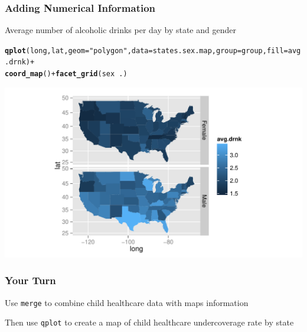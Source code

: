 \documentclass{beamer}\usepackage[]{graphicx}\usepackage[]{color}
\makeatletter
\newcommand{\hlstr}[1]{\textcolor[rgb]{0.192,0.494,0.8}{#1}}%
\newcommand{\hlopt}[1]{\textcolor[rgb]{0,0,0}{#1}}%
\newcommand{\hlstd}[1]{\textcolor[rgb]{0.345,0.345,0.345}{#1}}%
\newcommand{\hlkwc}[1]{\textcolor[rgb]{0.333,0.667,0.333}{#1}}%
\newcommand{\hlkwd}[1]{\textcolor[rgb]{0.737,0.353,0.396}{\textbf{#1}}}%
\newenvironment{kframe}{%
 \def\at@end@of@kframe{}%
 \ifinner\ifhmode%
  \def\at@end@of@kframe{\end{minipage}}%
  \begin{minipage}{\columnwidth}%
 \fi\fi%
 \def\FrameCommand##1{\hskip\@totalleftmargin \hskip-\fboxsep
 \colorbox{shadecolor}{##1}\hskip-\fboxsep
     \hskip-\linewidth \hskip-\@totalleftmargin \hskip\columnwidth}%
 \MakeFramed {\advance\hsize-\width
   \@totalleftmargin\z@ \linewidth\hsize
   \@setminipage}}%
 {\par\unskip\endMakeFramed%
 \at@end@of@kframe}
\newenvironment{knitrout}{}{} %
\makeatother
\begin{document}
\begin{frame}[fragile]
    \frametitle{Adding Numerical Information}

Average number of alcoholic drinks per day by state and gender

\begin{knitrout}\footnotesize
{}\color{fgcolor}\begin{kframe}
\begin{alltt}
\hlkwd{qplot}\hlstd{(long, lat,} \hlkwc{geom} \hlstd{=} \hlstr{"polygon"}\hlstd{,} \hlkwc{data} \hlstd{= states.sex.map,} \hlkwc{group} \hlstd{= group,} \hlkwc{fill} \hlstd{= avg.drnk)} \hlopt{+}
    \hlkwd{coord_map}\hlstd{()} \hlopt{+} \hlkwd{facet_grid}\hlstd{(sex} \hlopt{~} \hlstd{.)}
\end{alltt}
\end{kframe}
\includegraphics[width=\textwidth]{figure/kalcohol1} 

\end{knitrout}

\end{frame}


\begin{frame}
    \frametitle{Your Turn}
    Use \texttt{merge} to combine child healthcare data with maps information \\
    
    \vspace{.4in}
    
    Then use \texttt{qplot} to create a map of child healthcare undercoverage rate by state
 
\end{frame}

\end{document}
